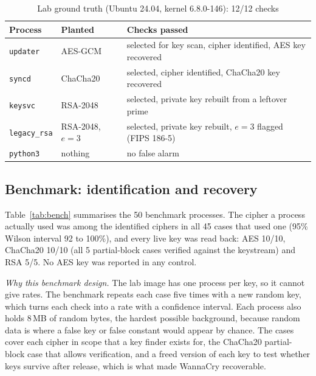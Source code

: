 \begin{table}[t]
\centering
\caption{Lab ground truth (Ubuntu 24.04, kernel 6.8.0-146): 12/12 checks}
\label{tab:lab}
\footnotesize
\setlength{\tabcolsep}{3pt}
\begin{tabularx}{\columnwidth}{@{}llX@{}}
\toprule
Process & Planted & Checks passed\\
\midrule
\texttt{updater} & AES-GCM & selected for key scan, cipher identified, AES key recovered\\
\texttt{syncd} & ChaCha20 & selected, cipher identified, ChaCha20 key recovered\\
\texttt{keysvc} & RSA-2048 & selected, private key rebuilt from a leftover prime\\
\texttt{legacy\_rsa} & RSA-2048, $e=3$ & selected, private key rebuilt, $e=3$ flagged (FIPS 186-5)\\
\texttt{python3} & nothing & no false alarm\\
\bottomrule
\end{tabularx}
\end{table}

\subsection{Benchmark: identification and recovery}
Table~\ref{tab:bench} summarises the 50 benchmark processes. The cipher a process actually used was among the
identified ciphers in all 45 cases that used one (95\% Wilson interval 92 to 100\%), and every live key was read
back: AES 10/10, ChaCha20 10/10 (all 5 partial-block cases verified against the keystream) and RSA 5/5. No AES
key was reported in any control.

\textit{Why this benchmark design.} The lab image has one process per key, so it cannot give rates. The
benchmark repeats each case five times with a new random key, which turns each check into a rate with a
confidence interval. Each process also holds 8\,MB of random bytes, the hardest possible background, because
random data is where a false key or false constant would appear by chance. The cases cover each cipher in scope
that a key finder exists for, the ChaCha20 partial-block case that allows verification, and a freed version of
each key to test whether keys survive after release, which is what made WannaCry recoverable.

